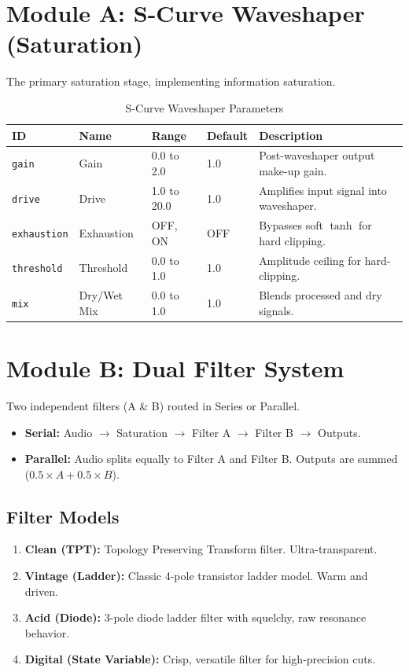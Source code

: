 \documentclass[11pt,a4paper,oneside]{book}
\begin{document}
\section{Module A: S-Curve Waveshaper (Saturation)}
The primary saturation stage, implementing information saturation.

\begin{table}[h]
    \centering
    \caption{S-Curve Waveshaper Parameters}
    \begin{tabular}{lllll}
        \toprule
        \textbf{ID} & \textbf{Name} & \textbf{Range} & \textbf{Default} & \textbf{Description} \\
        \midrule
        \texttt{gain} & Gain & 0.0 to 2.0 & 1.0 & Post-waveshaper output make-up gain. \\
        \texttt{drive} & Drive & 1.0 to 20.0 & 1.0 & Amplifies input signal into waveshaper. \\
        \texttt{exhaustion} & Exhaustion & OFF, ON & OFF & Bypasses soft $\tanh$ for hard clipping. \\
        \texttt{threshold} & Threshold & 0.0 to 1.0 & 1.0 & Amplitude ceiling for hard-clipping. \\
        \texttt{mix} & Dry/Wet Mix & 0.0 to 1.0 & 1.0 & Blends processed and dry signals. \\
        \bottomrule
    \end{tabular}
\end{table}

\section{Module B: Dual Filter System}
Two independent filters (A \& B) routed in Series or Parallel.
\begin{itemize}
    \item \textbf{Serial:} Audio $\rightarrow$ Saturation $\rightarrow$ Filter A $\rightarrow$ Filter B $\rightarrow$ Outputs.
    \item \textbf{Parallel:} Audio splits equally to Filter A and Filter B. Outputs are summed ($0.5 \times A + 0.5 \times B$).
\end{itemize}

\subsection{Filter Models}
\begin{enumerate}
    \item \textbf{Clean (TPT):} Topology Preserving Transform filter. Ultra-transparent.
    \item \textbf{Vintage (Ladder):} Classic 4-pole transistor ladder model. Warm and driven.
    \item \textbf{Acid (Diode):} 3-pole diode ladder filter with squelchy, raw resonance behavior.
    \item \textbf{Digital (State Variable):} Crisp, versatile filter for high-precision cuts.
\end{enumerate}
\end{document}
